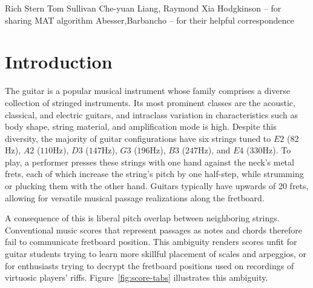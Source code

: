 \documentclass[12pt]{cmuthesis}
\begin{document}
\begin{acknowledgments}
Rich Stern
Tom Sullivan
Che-yuan Liang, Raymond Xia
Hodgkinson -- for sharing MAT algorithm
Abesser,Barbancho -- for their helpful correspondence
\end{acknowledgments}



\tableofcontents
\listoffigures
\listoftables

\mainmatter


%
%
%
%
%
\doublespacing
\noindent
\chapter{Introduction} 
The guitar is a popular musical instrument whose family comprises a diverse collection of stringed instruments. Its most prominent classes are the acoustic, classical, and electric guitars, and intraclass variation in characteristics such as body shape, string material, and amplification mode is high. Despite this diversity, the majority of guitar configurations have six strings tuned to $E2$ ($82$Hz), $A2$ ($110$Hz), $D3$ ($147$Hz), $G3$ ($196$Hz), $B3$ ($247$Hz), and $E4$ ($330$Hz). To play, a performer presses these strings with one hand against the neck's metal frets, each of which increase the string's pitch by one half-step, while strumming or plucking them with the other hand. Guitars typically have upwards of 20 frets, allowing for versatile musical passage realizations along the fretboard.

A consequence of this is liberal pitch overlap between neighboring strings. Conventional music scores that represent passages as notes and chords therefore fail to communicate fretboard position. This ambiguity renders scores unfit for guitar students trying to learn more skillful placement of scales and arpeggios, or for enthusiasts trying to decrypt the fretboard positions used on recordings of virtuosic players' riffs. Figure~\ref{fig:score-tabs} illustrates this ambiguity.
\end{document}

